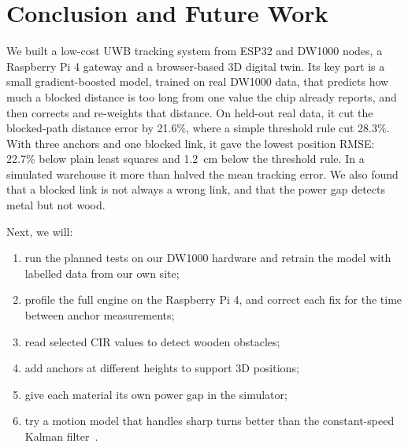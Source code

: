 \documentclass[conference]{IEEEtran}
\begin{document}
\section{Conclusion and Future Work}
We built a low-cost UWB tracking system from ESP32 and DW1000 nodes, a
Raspberry Pi 4 gateway and a browser-based 3D digital twin. Its key part is
a small gradient-boosted model, trained on real DW1000 data, that predicts
how much a blocked distance is too long from one value the chip already
reports, and then corrects and re-weights that distance. On held-out real
data, it cut the blocked-path distance error by 21.6\%, where a simple
threshold rule cut 28.3\%. With three anchors and one blocked link, it gave
the lowest position RMSE: 22.7\% below plain least squares and 1.2~cm below
the threshold rule. In a simulated warehouse it more than halved the mean
tracking error. We also found that a blocked link is
not always a wrong link, and that the power gap detects metal but not wood.

Next, we will:
\begin{enumerate}
    \item run the planned tests on our DW1000 hardware and retrain the model
    with labelled data from our own site;
    \item profile the full engine on the Raspberry Pi 4, and correct each
    fix for the time between anchor measurements;
    \item read selected CIR values to detect wooden obstacles;
    \item add anchors at different heights to support 3D positions;
    \item give each material its own power gap in the simulator;
    \item try a motion model that handles sharp turns better than the
    constant-speed Kalman filter~\cite{li2003survey}.
\end{enumerate}
\end{document}
